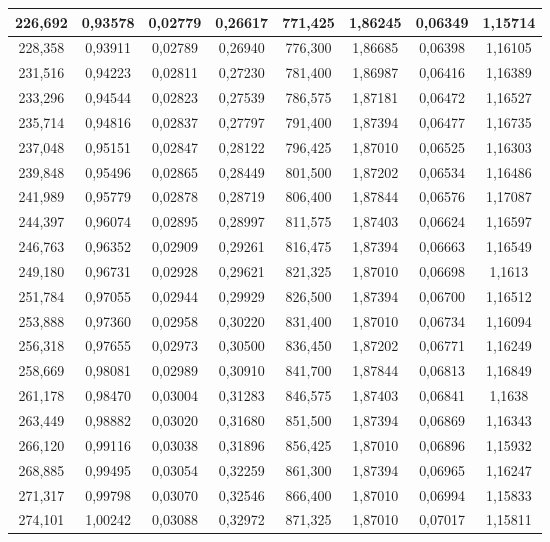 \documentclass[a4paper,12pt]{article}
\numberwithin{equation}{section}
\begin{document}
\begin{appendices}
\begin{longtable}[c]{|c|c|c|c|c|c|c|c|}
226,692	&	0,93578	&	0,02779	&	0,26617	&	771,425	&	1,86245	&	0,06349	&	1,15714	\\\hline
228,358	&	0,93911	&	0,02789	&	0,26940	&	776,300	&	1,86685	&	0,06398	&	1,16105	\\\hline
231,516	&	0,94223	&	0,02811	&	0,27230	&	781,400	&	1,86987	&	0,06416	&	1,16389	\\\hline
233,296	&	0,94544	&	0,02823	&	0,27539	&	786,575	&	1,87181	&	0,06472	&	1,16527	\\\hline
235,714	&	0,94816	&	0,02837	&	0,27797	&	791,400	&	1,87394	&	0,06477	&	1,16735	\\\hline
237,048	&	0,95151	&	0,02847	&	0,28122	&	796,425	&	1,87010	&	0,06525	&	1,16303	\\\hline
239,848	&	0,95496	&	0,02865	&	0,28449	&	801,500	&	1,87202	&	0,06534	&	1,16486	\\\hline
241,989	&	0,95779	&	0,02878	&	0,28719	&	806,400	&	1,87844	&	0,06576	&	1,17087	\\\hline
244,397	&	0,96074	&	0,02895	&	0,28997	&	811,575	&	1,87403	&	0,06624	&	1,16597	\\\hline
246,763	&	0,96352	&	0,02909	&	0,29261	&	816,475	&	1,87394	&	0,06663	&	1,16549	\\\hline
249,180	&	0,96731	&	0,02928	&	0,29621	&	821,325	&	1,87010	&	0,06698	&	1,1613	\\\hline
251,784	&	0,97055	&	0,02944	&	0,29929	&	826,500	&	1,87394	&	0,06700	&	1,16512	\\\hline
253,888	&	0,97360	&	0,02958	&	0,30220	&	831,400	&	1,87010	&	0,06734	&	1,16094	\\\hline
256,318	&	0,97655	&	0,02973	&	0,30500	&	836,450	&	1,87202	&	0,06771	&	1,16249	\\\hline
258,669	&	0,98081	&	0,02989	&	0,30910	&	841,700	&	1,87844	&	0,06813	&	1,16849	\\\hline
261,178	&	0,98470	&	0,03004	&	0,31283	&	846,575	&	1,87403	&	0,06841	&	1,1638	\\\hline
263,449	&	0,98882	&	0,03020	&	0,31680	&	851,500	&	1,87394	&	0,06869	&	1,16343	\\\hline
266,120	&	0,99116	&	0,03038	&	0,31896	&	856,425	&	1,87010	&	0,06896	&	1,15932	\\\hline
268,885	&	0,99495	&	0,03054	&	0,32259	&	861,300	&	1,87394	&	0,06965	&	1,16247	\\\hline
271,317	&	0,99798	&	0,03070	&	0,32546	&	866,400	&	1,87010	&	0,06994	&	1,15833	\\\hline
274,101	&	1,00242	&	0,03088	&	0,32972	&	871,325	&	1,87010	&	0,07017	&	1,15811	\\\hline

\end{longtable}
\end{appendices}
\end{document}
